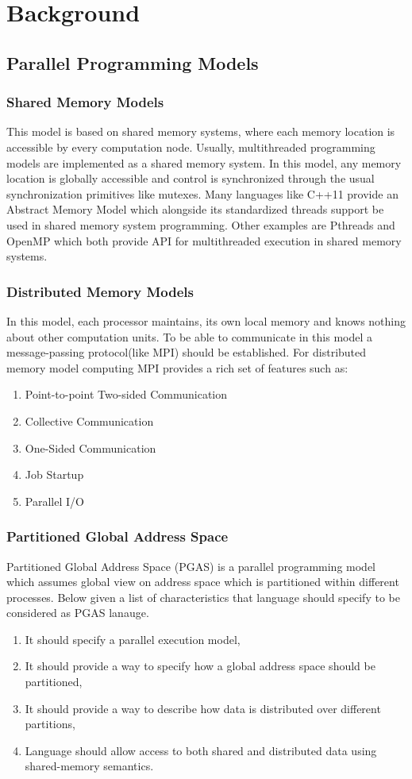 \documentclass[14pt]{extreport}
\newcommand\blankpage{
    \null
    \thispagestyle{empty}
    \newpage
    }
\begin{document}
\blankpage
\chapter{Background}
\section{Parallel Programming Models}
\subsection{Shared Memory Models}
This model is based on shared memory systems, where each memory location is accessible by every computation node. Usually, multithreaded programming models are implemented as a shared memory system. In this model, any memory location is globally accessible and control is synchronized through the usual synchronization primitives like mutexes. Many languages like C++11 provide an Abstract Memory Model which alongside its standardized threads support be used in shared memory system programming. Other examples are Pthreads and OpenMP which both provide API for multithreaded execution in shared memory systems.
\subsection{Distributed Memory Models}
In this model, each processor maintains, its own local memory and knows nothing about other computation units.
To be able to communicate in this model a message-passing protocol(like MPI) should be established. For distributed memory model computing MPI provides a rich set of features such as:
\begin{enumerate}
\item Point-to-point Two-sided Communication
\item Collective Communication 
\item One-Sided Communication
\item Job Startup
\item Parallel I/O
\end{enumerate}

\subsection{Partitioned Global Address Space}
Partitioned Global Address Space (PGAS) is a parallel programming model which assumes global view on address space which is partitioned within different processes. Below given a list of characteristics that language should specify to be considered as PGAS lanauge\cite{pgaslangs}.
\begin{enumerate}
	\item It should specify a parallel execution model,
	\item It should provide a way to specify how a global address space should be partitioned,
	\item It should provide a way to describe how data is distributed over different partitions,
	\item Language should allow access to both shared and distributed data using shared-memory semantics.
\end{enumerate}
\end{document}
